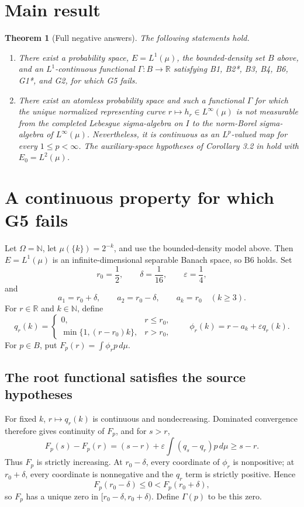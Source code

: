 \documentclass[11pt]{article}
\newtheorem{theorem}{Theorem}
\newcommand{\1}{\mathbf 1}
\newcommand{\R}{\mathbb R}
\newcommand{\N}{\mathbb N}
\begin{document}
\section{Main result}

\begin{theorem}[Full negative answers]\label{thm:main}
The following statements hold.
\begin{enumerate}[label=\textup{(\Alph*)}]
\item There exist a probability space, $E=L^1(\mu)$, the bounded-density set
  $B$ above, and an $L^1$-continuous functional $\Gamma:B\to\R$ satisfying
  B1, B2*, B3, B4, B6, G1*, and G2, for which G5 fails.
\item There exist an atomless probability space and such a functional
  $\Gamma$ for which the unique normalized representing curve
  $r\mapsto h_r\in L^\infty(\mu)$ is not measurable from the completed
  Lebesgue sigma-algebra on $I$ to the norm-Borel sigma-algebra of
  $L^\infty(\mu)$.  Nevertheless, it is continuous as an $L^p$-valued map
  for every $1\leq p<\infty$.  The auxiliary-space hypotheses of Corollary
  3.2 in \cite{Steinwart2015} hold with $E_0=L^2(\mu)$.
\end{enumerate}
\end{theorem}

\section{A continuous property for which G5 fails}

Let $\Omega=\N$, let $\mu(\{k\})=2^{-k}$, and use the bounded-density model
above.  Then $E=L^1(\mu)$ is an infinite-dimensional separable Banach space,
so B6 holds.  Set
\[
 r_0=\frac12,\qquad \delta=\frac1{16},\qquad \varepsilon=\frac14,
\]
and
\[
 a_1=r_0+\delta,\qquad a_2=r_0-\delta,\qquad a_k=r_0\quad(k\geq3).
\]
For $r\in\R$ and $k\in\N$, define
\[
 q_r(k)=
 \begin{cases}
 0,&r\leq r_0,\\
 \min\{1,(r-r_0)k\},&r>r_0,
 \end{cases}
 \qquad
 \phi_r(k)=r-a_k+\varepsilon q_r(k).
\]
For $p\in B$, put $F_p(r)=\int\phi_rp\,d\mu$.

\subsection{The root functional satisfies the source hypotheses}

For fixed $k$, $r\mapsto q_r(k)$ is continuous and nondecreasing.  Dominated
convergence therefore gives continuity of $F_p$, and for $s>r$,
\[
 F_p(s)-F_p(r)
  =(s-r)+\varepsilon\int(q_s-q_r)p\,d\mu\geq s-r.
\]
Thus $F_p$ is strictly increasing.  At $r_0-\delta$, every coordinate of
$\phi_r$ is nonpositive; at $r_0+\delta$, every coordinate is nonnegative and
the $q_r$ term is strictly positive.  Hence
\[
 F_p(r_0-\delta)\leq0<F_p(r_0+\delta),
\]
so $F_p$ has a unique zero in $[r_0-\delta,r_0+\delta)$.  Define
$\Gamma(p)$ to be this zero.
\end{document}
